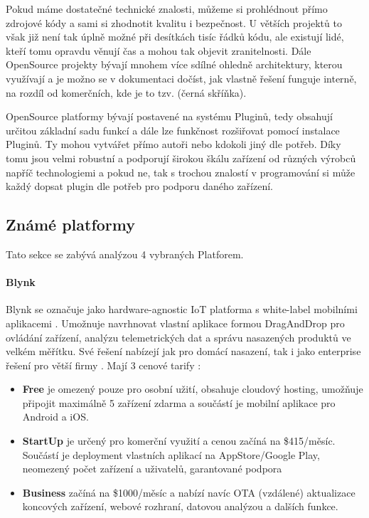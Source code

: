 Pokud máme dostatečné technické znalosti, můžeme si prohlédnout přímo zdrojové kódy a sami si zhodnotit kvalitu i bezpečnost. U větších projektů to však již není tak úplně možné při desítkách tisíc řádků kódu, ale existují lidé, kteří tomu opravdu věnují čas a mohou tak objevit zranitelnosti. Dále OpenSource projekty bývají mnohem více sdílné ohledně architektury, kterou využívají a je možno se v dokumentaci dočíst, jak vlastně řešení funguje interně, na rozdíl od komerčních, kde je to tzv.  (černá skříňka).

OpenSource platformy bývají postavené na systému Pluginů, tedy obsahují určitou základní sadu funkcí a dále lze funkčnost rozšiřovat pomocí instalace Pluginů. Ty mohou vytvářet přímo autoři nebo kdokoli jiný dle potřeb. Díky tomu jsou velmi robustní a podporují širokou škálu zařízení od různých výrobců napříč technologiemi a pokud ne, tak s trochou znalostí v programování si může každý dopsat plugin dle potřeb pro podporu daného zařízení.


\subsection{Známé platformy}
Tato sekce se zabývá analýzou 4 vybraných Platforem.

\paragraph{Blynk}
Blynk se označuje jako hardware-agnostic IoT platforma s white-label mobilními aplikacemi \cite{blynk}. Umožnuje navrhnovat vlastní aplikace formou DragAndDrop pro ovládání zařízení, analýzu telemetrických dat a správu nasazených produktů ve velkém měřítku. Své řešení nabízejí jak pro domácí nasazení, tak i jako enterprise řešení pro větší firmy \cite{blynk}. Mají 3 cenové tarify \cite{blynk-pricing}:
\begin{itemize}
    \item \textbf{Free} je omezený pouze pro osobní užití, obsahuje cloudový hosting, umožňuje připojit maximálně 5 zařízení zdarma a součástí je mobilní aplikace pro Android a iOS.
    \item \textbf{StartUp} je určený pro komerční využití a cenou začíná na \$415/měsíc. Součástí je deployment vlastních aplikací na AppStore/Google Play, neomezený počet zařízení a uživatelů, garantované podpora
    \item \textbf{Business} začíná na \$1000/měsíc a nabízí navíc OTA (vzdálené) aktualizace koncových zařízení, webové rozhraní, datovou analýzou a dalších funkce.
\end{itemize}

